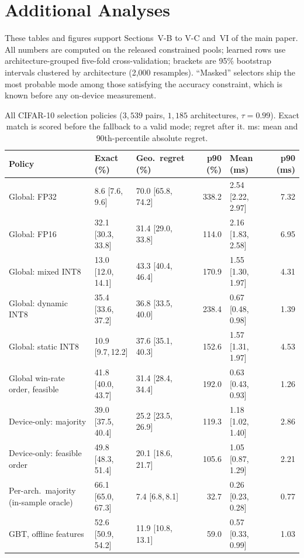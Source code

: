 \section{Additional Analyses}
These tables and figures support Sections~V-B to V-C and~VI of the main paper. All
numbers are computed on the released constrained pools; learned rows use
architecture-grouped five-fold cross-validation; brackets are 95\% bootstrap
intervals clustered by architecture (2{,}000 resamples). ``Masked'' selectors
ship the most probable mode among those satisfying the accuracy constraint,
which is known before any on-device measurement.

\begin{table}[!htbp]
\centering
\caption{All CIFAR-10 selection policies ($3{,}539$ pairs, $1{,}185$
architectures, $\tau=0.99$). Exact match is scored before the fallback to a
valid mode; regret after it. ms: mean and 90th-percentile absolute regret.}
\label{tab:policies_full}
\footnotesize
\setlength{\tabcolsep}{4pt}
\begin{tabular}{@{}lllrlr@{}}
\toprule
\textbf{Policy} & \textbf{Exact (\%)} & \textbf{Geo.\ regret (\%)} & \textbf{p90 (\%)} & \textbf{Mean (ms)} & \textbf{p90 (ms)}\\
\midrule
Global: FP32 & 8.6 [7.6,\,9.6] & 70.0 [65.8,\,74.2] & 338.2 & 2.54 [2.22,\,2.97] & 7.32 \\
Global: FP16 & 32.1 [30.3,\,33.8] & 31.4 [29.0,\,33.8] & 114.0 & 2.16 [1.83,\,2.58] & 6.95 \\
Global: mixed INT8 & 13.0 [12.0,\,14.1] & 43.3 [40.4,\,46.4] & 170.9 & 1.55 [1.30,\,1.97] & 4.31 \\
Global: dynamic INT8 & 35.4 [33.6,\,37.2] & 36.8 [33.5,\,40.0] & 238.4 & 0.67 [0.48,\,0.98] & 1.39 \\
Global: static INT8 & 10.9 [9.7,\,12.2] & 37.6 [35.1,\,40.3] & 152.6 & 1.57 [1.31,\,1.97] & 4.53 \\
\midrule
Global win-rate order, feasible & 41.8 [40.0,\,43.7] & 31.4 [28.4,\,34.4] & 192.0 & 0.63 [0.43,\,0.93] & 1.26 \\
Device-only: majority & 39.0 [37.5,\,40.4] & 25.2 [23.5,\,26.9] & 119.3 & 1.18 [1.02,\,1.40] & 2.86 \\
Device-only: feasible order & 49.8 [48.3,\,51.4] & 20.1 [18.6,\,21.7] & 105.6 & 1.05 [0.87,\,1.29] & 2.21 \\
Per-arch.\ majority (in-sample oracle) & 66.1 [65.0,\,67.3] & 7.4 [6.8,\,8.1] & 32.7 & 0.26 [0.23,\,0.28] & 0.77 \\
\midrule
GBT, offline features & 52.6 [50.9,\,54.2] & 11.9 [10.8,\,13.1] & 59.0 & 0.57 [0.33,\,0.99] & 1.03 \\

\end{tabular}
\end{table}
